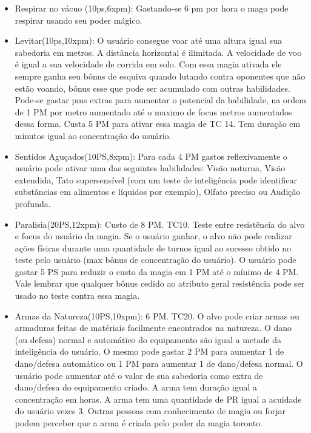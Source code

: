 \begin{itemize}
	\item Respirar no vácuo (10ps,6xpm): Gastando-se 6 pm por hora o mago pode respirar usando seu poder mágico. 

\item Levitar(10ps,10xpm): O usuário consegue voar até uma altura igual sua sabedoria em metros. A distância horizontal é ilimitada. A velocidade de voo é igual a sua velocidade de corrida em solo. Com essa magia ativada ele sempre ganha seu bônus de esquiva quando lutando contra oponentes que não estão voando, bônus esse que pode ser acumulado com outras habilidades. Pode-se gastar pms extras para aumentar o potencial da habilidade, na ordem de 1 PM por metro aumentado até o maximo de focus metros aumentados dessa forma. Custa 5 PM para ativar essa magia de TC 14. Tem duração em minutos igual ao concentração do usuário.

	\item Sentidos Aguçados(10PS,8xpm): Para cada 4 PM gastos reflexivamente o usuário pode ativar uma das seguintes habilidades: Visão noturna, Visão extendida, Tato supersensível (com um teste de inteligência pode identificar substâncias em alimentos e líquidos por exemplo), Olfato preciso ou Audição profunda.

	\item Paralisia(20PS,12xpm): Custo de 8 PM. TC10.\newline
Teste entre resistência do alvo e focus do usuário da magia. Se o usuário ganhar, o alvo não pode realizar ações físicas durante uma quantidade de turnos igual ao sucesso obtido no teste pelo usuário (max bônus de concentração do usuário). O usuário pode gastar 5 PS para reduzir o custo da magia em 1 PM até o mínimo de 4 PM. Vale lembrar que qualquer bônus cedido ao atributo geral resistência pode ser usado no teste contra essa magia.

	
	\item Armas da Natureza(10PS,10xpm): 6 PM. TC20.\newline
O alvo pode criar armas ou armaduras feitas de matériais facilmente encontrados na natureza. O dano (ou defesa) normal e automático do equipamento são igual a metade da inteligência do usuário. O mesmo pode gastar 2 PM para aumentar 1 de dano/defesa automático ou 1 PM para aumentar 1 de dano/defesa normal. O usuário pode aumentar até o valor de sua sabedoria como extra de dano/defesa do equipamento criado. A arma tem duração igual a concentração em horas. A arma tem uma quantidade de PR igual a acuidade do usuário vezes 3. Outras pessoas com conhecimento de magia ou forjar podem perceber que a arma é criada pelo poder da magia toronto.
	

\end{itemize}
